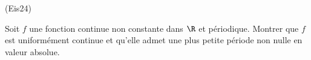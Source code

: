\begin{tiny}(Eis24)\end{tiny} Soit $f$ une fonction continue non constante dans $\R$ et p{\'e}riodique. Montrer que $f$ est uniform{\'e}ment continue et qu'elle admet une plus petite p{\'e}riode non nulle en valeur absolue.